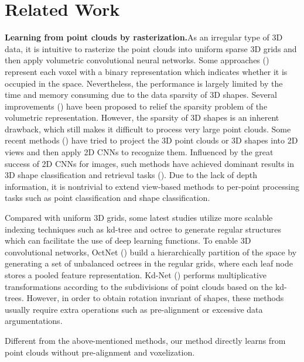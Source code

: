 \documentclass[letterpaper]{article}
\begin{document}
\section{Related Work}
\noindent
\textbf{Learning from point clouds by rasterization.}\quad  As an irregular type of 3D data, it is intuitive to rasterize the point clouds into uniform sparse 3D grids and then apply volumetric convolutional neural networks.
Some approaches (\citealt{wu20153d,maturana2015voxnet}) represent each voxel with a binary representation which indicates whether it is occupied in the space.
Nevertheless, the performance is largely limited by the time and memory consuming due to the data sparsity of 3D shapes.
Several improvements (\citealt{li2016fpnn,wang2015voting}) have been proposed to relief the sparsity problem of the volumetric representation.
However, the sparsity of 3D shapes is an inherent drawback, which still makes it difficult to process very large point clouds.
Some recent methods (\citealt{su2015multi,wang2017dominant}) have tried to project the 3D point clouds or 3D shapes into 2D views and then apply 2D CNNs to recognize them.
Influenced by the great success of 2D CNNs for images, such methods have achieved dominant results in 3D shape classification and retrieval tasks (\citealt{kanezaki2016rotationnet}).
Due to the lack of depth information, it is nontrivial to extend view-based methods to per-point processing tasks such as point classification and shape classification.


Compared with uniform 3D grids, some latest studies utilize more scalable indexing techniques such as kd-tree and octree to generate  regular structures which can facilitate the use of deep learning functions.
To enable 3D convolutional networks, OctNet (\citealt{riegler2017octnet}) build a hierarchically partition of the space by generating a set of unbalanced octrees in the regular grids, where each leaf node stores a pooled feature representation.
Kd-Net (\citealt{klokov2017escape}) performs multiplicative transformations according to the subdivisions of point clouds based on the kd-trees.
However, in order to obtain rotation invariant of shapes,  these methods usually require extra operations such as pre-alignment or excessive data argumentations.

Different from the above-mentioned methods, our method directly learns from point clouds without pre-alignment and voxelization.
\end{document}
